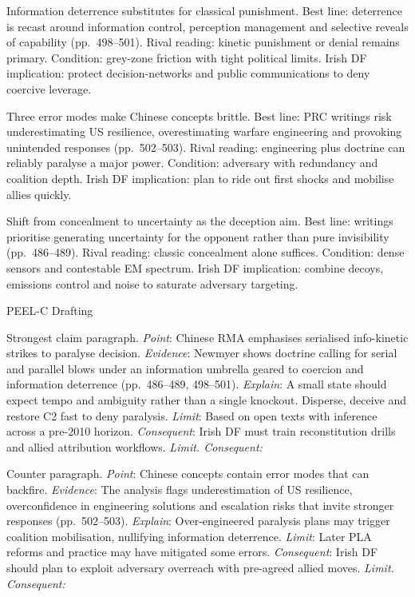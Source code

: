 Information deterrence substitutes for classical punishment.
Best line: deterrence is recast around information control, perception management and selective reveals of capability (pp.~498–501). Rival reading: kinetic punishment or denial remains primary. Condition: grey-zone friction with tight political limits. Irish DF implication: protect decision-networks and public communications to deny coercive leverage.

Three error modes make Chinese concepts brittle.
Best line: PRC writings risk underestimating US resilience, overestimating warfare engineering and provoking unintended responses (pp.~502–503). Rival reading: engineering plus doctrine can reliably paralyse a major power. Condition: adversary with redundancy and coalition depth. Irish DF implication: plan to ride out first shocks and mobilise allies quickly.

Shift from concealment to uncertainty as the deception aim.
Best line: writings prioritise generating uncertainty for the opponent rather than pure invisibility (pp.~486–489). Rival reading: classic concealment alone suffices. Condition: dense sensors and contestable EM spectrum. Irish DF implication: combine decoys, emissions control and noise to saturate adversary targeting.

PEEL-C Drafting

Strongest claim paragraph.
\textit{Point}: Chinese RMA emphasises serialised info-kinetic strikes to paralyse decision.
\textit{Evidence}: Newmyer shows doctrine calling for serial and parallel blows under an information umbrella geared to coercion and information deterrence (pp.~486–489, 498–501).
\textit{Explain}: A small state should expect tempo and ambiguity rather than a single knockout. Disperse, deceive and restore C2 fast to deny paralysis.
\textit{Limit}: Based on open texts with inference across a pre-2010 horizon.
\textit{Consequent}: Irish DF must train reconstitution drills and allied attribution workflows.
\textit{Limit. Consequent:}

Counter paragraph.
\textit{Point}: Chinese concepts contain error modes that can backfire.
\textit{Evidence}: The analysis flags underestimation of US resilience, overconfidence in engineering solutions and escalation risks that invite stronger responses (pp.~502–503).
\textit{Explain}: Over-engineered paralysis plans may trigger coalition mobilisation, nullifying information deterrence.
\textit{Limit}: Later PLA reforms and practice may have mitigated some errors.
\textit{Consequent}: Irish DF should plan to exploit adversary overreach with pre-agreed allied moves.
\textit{Limit. Consequent:}

